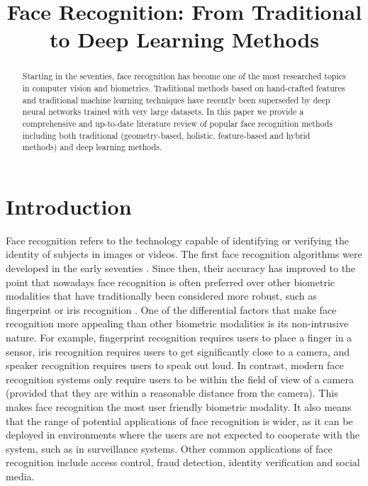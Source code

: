 \documentclass[conference]{IEEEtran}
\begin{document}
\title{Face Recognition: From Traditional to Deep Learning Methods}

\author{
\and
{}
}

\maketitle

\begin{abstract}
Starting in the seventies, face recognition has become one of the most researched topics in computer vision and biometrics. Traditional methods based on hand-crafted features and traditional machine learning techniques have recently been superseded by deep neural networks trained with very large datasets. In this paper we provide a comprehensive and up-to-date literature review of popular face recognition methods including both traditional (geometry-based, holistic, feature-based and hybrid methods) and deep learning methods.
\end{abstract}


\section{Introduction}
\label{sec:introduction}

Face recognition refers to the technology capable of identifying or verifying the identity of subjects in images or videos. The first face recognition algorithms were developed in the early seventies \cite{kelly1970visual,kanade1973picture}. Since then, their accuracy has improved to the point that nowadays face recognition is often preferred over other biometric modalities that have traditionally been considered more robust, such as fingerprint or iris recognition \cite{delac2004survey}. One of the differential factors that make face recognition more appealing than other biometric modalities is its non-intrusive nature. For example, fingerprint recognition requires users to place a finger in a sensor, iris recognition requires users to get significantly close to a camera, and speaker recognition requires users to speak out loud. In contrast, modern face recognition systems only require users to be within the field of view of a camera (provided that they are within a reasonable distance from the camera). This makes face recognition the most user friendly biometric modality. It also means that the range of potential applications of face recognition is wider, as it can be deployed in environments where the users are not expected to cooperate with the system, such as in surveillance systems. Other common applications of face recognition include access control, fraud detection, identity verification and social media.
\end{document}

